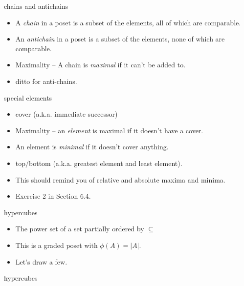 \documentclass[handout,landscape]{beamer}
\begin{document}
\begin{frame}{chains and antichains}
\begin{itemize}
\item A \emph{chain} in a poset is a subset of the elements, all 
of which are comparable. \pause
\item An {\em antichain} in a poset is a subset
of the elements, none of which are comparable.\pause
\item Maximality -- A chain is {\em maximal} if it can't be added to. \pause
\item ditto for anti-chains.
\end{itemize}
\end{frame}

\begin{frame}{special elements}
\begin{itemize}
\item cover \pause (a.k.a. immediate successor) \pause
\item Maximality -- an {\em element} is maximal if it doesn't have a cover.\pause
\item An element is {\em minimal} if it doesn't cover anything.\pause
\item top/bottom \pause (a.k.a. greatest element and least element). \pause
\item This should remind you of relative and absolute maxima and minima. \pause
\item Exercise 2 in Section 6.4.
\end{itemize}
\end{frame}

\begin{frame}{hypercubes}
\begin{itemize}
\item The power set of a set partially ordered by $\subseteq$ \pause
\item This is a graded poset with $\phi(A) = |A|$.
\item Let's draw a few.
\end{itemize}
\end{frame}

\begin{frame}{\sout{hyper}cubes}



\end{frame}
\end{document}
